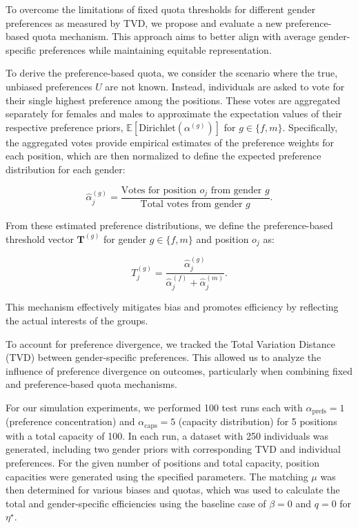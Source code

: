 \documentclass[letterpaper]{article}
\begin{document}
To overcome the limitations of fixed quota thresholds for different gender preferences as measured by TVD, we propose and evaluate a new preference-based quota mechanism. This approach aims to better align with average gender-specific preferences while maintaining equitable representation.

To derive the preference-based quota, we consider the scenario where the true, unbiased preferences \( U \) are not known. Instead, individuals are asked to vote for their single highest preference among the positions. These votes are aggregated separately for females and males to approximate the expectation values of their respective preference priors, \( \mathbb{E}[\textrm{Dirichlet}(\alpha^{(g)})] \) for \( g \in \{f, m\} \). Specifically, the aggregated votes provide empirical estimates of the preference weights for each position, which are then normalized to define the expected preference distribution for each gender:

\[
\hat{\alpha}^{(g)}_j = \frac{\text{Votes for position } o_j \text{ from gender } g}{\text{Total votes from gender } g}.
\]

From these estimated preference distributions, we define the preference-based threshold vector \( \mathbf{T}^{(g)} \) for gender \( g \in \{f, m\} \) and position \( o_j \) as:

\[
T_j^{(g)} = \frac{\hat{\alpha}^{(g)}_j}{\hat{\alpha}^{(f)}_j + \hat{\alpha}^{(m)}_j}.
\]

This mechanism effectively mitigates bias and promotes efficiency by reflecting the actual interests of the groups.

To account for preference divergence, we tracked the Total Variation Distance (TVD) between gender-specific preferences. This allowed us to analyze the influence of preference divergence on outcomes, particularly when combining fixed and preference-based quota mechanisms.


For our simulation experiments, we performed 100 test runs each with \( \alpha_\text{prefs} = 1 \) (preference concentration) and \( \alpha_\text{caps} = 5 \) (capacity distribution) for 5 positions with a total capacity of 100. In each run, a dataset with 250 individuals was generated, including two gender priors with corresponding TVD and individual preferences. For the given number of positions and total capacity, position capacities were generated using the specified parameters. The matching \( \mu \) was then determined for various biases and quotas, which was used to calculate the total and gender-specific efficiencies using the baseline case of \( \beta = 0 \) and \( q = 0 \) for \(\eta^{\star}\). 
\end{document}

